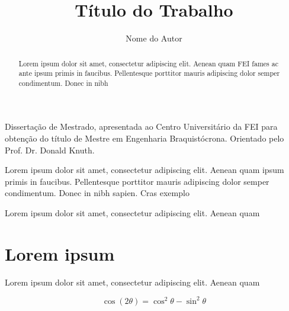 \documentclass[acronym,symbols]{fei}
\author{Nome do Autor}
\title{Título do Trabalho}
\begin{document}
\maketitle

\begin{folhaderosto}
Dissertação de Mestrado, apresentada ao Centro Universitário da FEI para obtenção do título de Mestre em Engenharia Braquistócrona. Orientado pelo Prof. Dr. Donald Knuth.
\end{folhaderosto}

\fichacatalografica
\folhadeaprovacao


\begin{agradecimentos}
Lorem ipsum dolor sit amet, consectetur adipiscing elit. Aenean quam  ipsum primis in faucibus. Pellentesque porttitor mauris adipiscing dolor semper condimentum. Donec in nibh sapien. Cras exemplo 
\end{agradecimentos}

\begin{epigrafe}
\end{epigrafe}

\begin{resumo}
Lorem ipsum dolor sit amet, consectetur adipiscing elit. Aenean quam 
\end{resumo}

\begin{abstract}
  Lorem ipsum dolor sit amet, consectetur adipiscing elit. Aenean quam  FEI fames ac ante ipsum primis in faucibus. Pellentesque porttitor mauris adipiscing dolor semper condimentum. Donec in nibh 
\end{abstract}

\listoffigures
\listoftables
\listofalgorithms
\printglossaries
\tableofcontents

\chapter{Lorem ipsum}

Lorem ipsum dolor sit amet, consectetur adipiscing elit. Aenean quam 

\begin{equation}
\cos (2\theta) = \cos^2 \theta - \sin^2 \theta
\end{equation}
\end{document}
